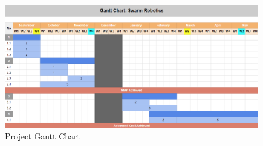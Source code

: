 \begin{figure} [H]
    \centering
    \includegraphics[width=1\linewidth]{assets/images/introduction/gantt_chart.png}
    \caption{Project Gantt Chart}
    \label{fig:gantt-chart}
\end{figure}

